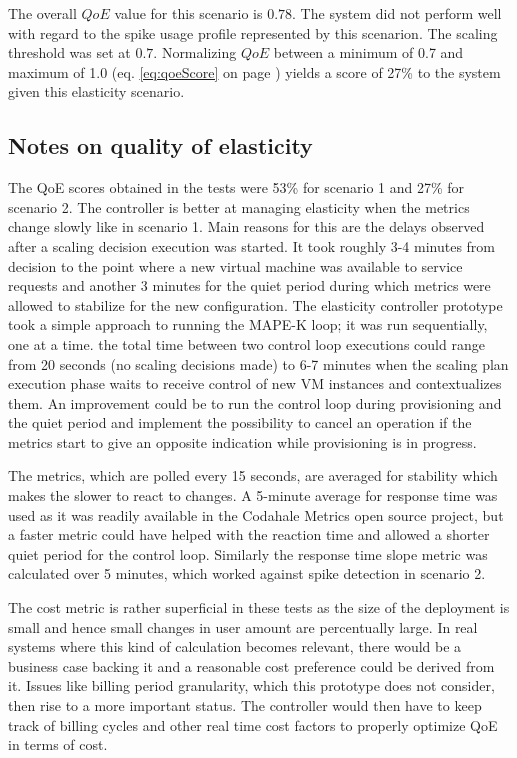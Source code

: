 \documentclass[english]{tktltiki2}
\theoremstyle{definition}
\theoremstyle{remark}
\begin{document}
The overall $QoE$ value for this scenario is $0.78$. The system did not perform
well with regard to the spike usage profile represented by this scenarion. The
scaling threshold was set at $0.7$. Normalizing $QoE$ between a minimum of 0.7
and maximum of 1.0 (eq. \ref{eq:qoeScore} on page \pageref{eq:qoeScore}) yields
a score of 27\% to the system given this elasticity scenario.

\subsection{Notes on quality of elasticity}

The QoE scores obtained in the tests were 53\% for scenario 1 and 27\% for
scenario 2. The controller is better at managing elasticity when the metrics
change slowly like in scenario 1. Main reasons for this are the delays observed
after a scaling decision execution was started. It took roughly 3-4 minutes from
decision to the point where a new virtual machine was available to service
requests and another 3 minutes for the quiet period during which metrics were
allowed to stabilize for the new configuration. The elasticity controller
prototype took a simple approach to running the MAPE-K loop; it was run
sequentially, one at a time. the total time between two control loop executions
could range from 20 seconds (no scaling decisions made) to 6-7 minutes when the
scaling plan execution phase waits to receive control of new VM instances and
contextualizes them. An improvement could be to run the control loop during
provisioning and the quiet period and implement the possibility to cancel an
operation if the metrics start to give an opposite indication while provisioning
is in progress.

The metrics, which are polled every 15 seconds, are averaged for stability which
makes the slower to react to changes. A 5-minute average for response time was
used as it was readily available in the Codahale Metrics open source project,
but a faster metric could have helped with the reaction time and allowed a
shorter quiet period for the control loop. Similarly the response time slope
metric was calculated over 5 minutes, which worked against spike detection in
scenario 2.

The cost metric is rather superficial in these tests as the size of the
deployment is small and hence small changes in user amount are percentually
large. In real systems where this kind of calculation becomes relevant, there
would be a business case backing it and a reasonable cost preference could be
derived from it. Issues like billing period granularity, which this prototype
does not consider, then rise to a more important status. The controller would
then have to keep track of billing cycles and other real time cost factors to
properly optimize QoE in terms of cost.
\end{document}
